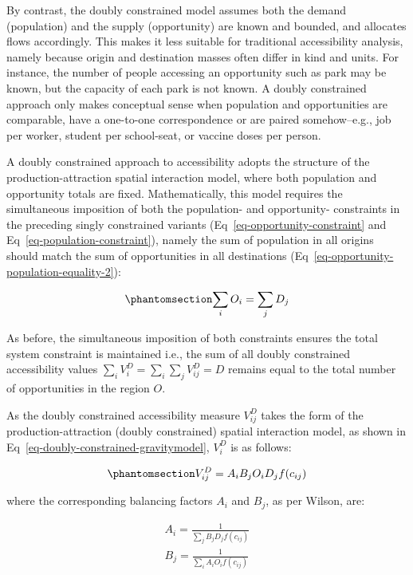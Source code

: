 \documentclass[
  10pt,
  letterpaper,
]{article}
\begin{document}
By contrast, the doubly constrained model assumes both the demand
(population) and the supply (opportunity) are known and bounded, and
allocates flows accordingly. This makes it less suitable for traditional
accessibility analysis, namely because origin and destination masses
often differ in kind and units. For instance, the number of people
accessing an opportunity such as park may be known, but the capacity of
each park is not known. A doubly constrained approach only makes
conceptual sense when population and opportunities are comparable, have
a one-to-one correspondence or are paired somehow--e.g., job per worker,
student per school-seat, or vaccine doses per person.

A doubly constrained approach to accessibility adopts the structure of
the production-attraction spatial interaction model, where both
population and opportunity totals are fixed. Mathematically, this model
requires the simultaneous imposition of both the population- and
opportunity- constraints in the preceding singly constrained variants
(Eq~\ref{eq-opportunity-constraint} and
Eq~\ref{eq-population-constraint}), namely the sum of population in all
origins should match the sum of opportunities in all destinations
(Eq~\ref{eq-opportunity-population-equality-2}):

\begin{equation}\phantomsection\label{eq-opportunity-population-equality-2}{
\sum_i O_i = \sum_j D_j
}\end{equation}

As before, the simultaneous imposition of both constraints ensures the
total system constraint is maintained i.e., the sum of all doubly
constrained accessibility values
\(\sum_i V^D_{i} = \sum_i\sum_j  V^D_{ij} = D\) remains equal to the
total number of opportunities in the region \(O\).

As the doubly constrained accessibility measure \(V_{ij}^D\) takes the
form of the production-attraction (doubly constrained) spatial
interaction model, as shown in
Eq~\ref{eq-doubly-constrained-gravitymodel}, \(V_{i}^D\) is as follows:

\begin{equation}\phantomsection\label{eq-doubly-constrained-accessibility}{
V_{ij}^D = A_i B_j O_i D_j f(c_{ij})
}\end{equation}

\noindent where the corresponding balancing factors \(A_i\) and \(B_j\),
as per Wilson, are:

\[
\begin{array}{l}
A_i = \frac{1}{\sum_j B_j D_j f(c_{ij})}\\
B_j = \frac{1}{\sum_i A_i O_i f(c_{ij})}
\end{array}
\]
\end{document}
